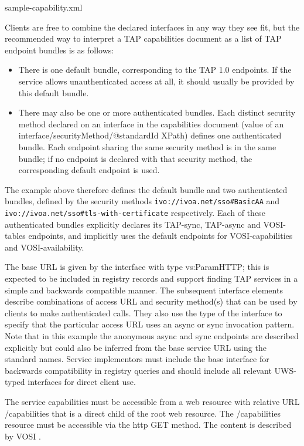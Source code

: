 \documentclass[11pt,letter]{ivoa}
\begin{document}

  {sample-capability.xml}

Clients are free to combine the declared interfaces in any way they see fit, but the recommended way to interpret a TAP capabilities document as a list of TAP endpoint bundles is as follows:
\begin{itemize}
\item There is one default bundle, corresponding to the TAP 1.0 endpoints. If the service allows unauthenticated access at all, it should usually be provided by this default bundle.
\item There may also be one or more authenticated bundles. Each distinct security method declared on an interface in the capabilities document (value of an interface/securityMethod/@standardId XPath) defines one authenticated bundle. Each endpoint sharing the same security method is in the same bundle; if no endpoint is declared with that security method, the corresponding default endpoint is used. 
\end{itemize}

The example above therefore defines the default bundle and two authenticated bundles, defined by the security methods \verb|ivo://ivoa.net/sso#BasicAA| and \verb|ivo://ivoa.net/sso#tls-with-certificate| respectively. Each of these authenticated bundles explicitly declares its TAP-sync, TAP-async and VOSI-tables endpoints, and implicitly uses the default endpoints for VOSI-capabilities and VOSI-availability.

The base URL is given by the interface with type vs:ParamHTTP; this is expected to be 
included in registry records and support finding TAP services in a simple and backwards 
compatible manner. The subsequent interface elements describe combinations of access URL
and security method(s) that can be used by clients to make authenticated calls. They also 
use the type of the interface to specify that the particular access URL uses an async or sync 
invocation pattern. Note that in this example the anonymous async and sync endpoints are 
described explicitly but could also be inferred from the base service URL using the standard 
names. Service implementors must include the base interface for backwards compatibility in
registry queries and should include all relevant UWS-typed interfaces for direct client use.

The service capabilities must be accessible from a web resource with relative 
URL /capabilities that is a direct child of the root web resource. The 
/capabilities resource must be accessible via the http GET method. The content 
is described by VOSI \citep{std:VOSI11}.
\end{document}
